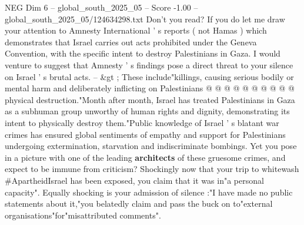 \begin{textsample}{NEG Dim 6 – global\_south\_2025\_05 – Score -1.00 – global\_south\_2025\_05/124634298.txt}
Don't you read?
If you do let me draw your attention to Amnesty International ' s reports ( not Hamas ) which demonstrates that Israel carries out acts prohibited under the Geneva Convention, with the specific intent to destroy Palestinians in Gaza.
I would venture to suggest that Amnesty ' s findings pose a direct threat to your silence on Israel ' s brutal acts. -- \&gt ; These include"killings, causing serious bodily or mental harm and deliberately inflicting on Palestinians @ @ @ @ @ @ @ @ @ @ physical destruction."Month after month, Israel has treated Palestinians in Gaza as a subhuman group unworthy of human rights and dignity, demonstrating its intent to physically destroy them."Public knowledge of Israel ' s blatant war crimes has ensured global sentiments of empathy and support for Palestinians undergoing extermination, starvation and indiscriminate bombings.
Yet you pose in a picture with one of the leading \textbf{architects} of these gruesome crimes, and expect to be immune from criticism?
Shockingly now that your trip to whitewash \#ApartheidIsrael has been exposed, you claim that it was in"a personal capacity".
Equally shocking is your admission of silence :"I have made no public statements about it,"you belatedly claim and pass the buck on to"external organisations"for"misattributed comments".

\end{textsample}
